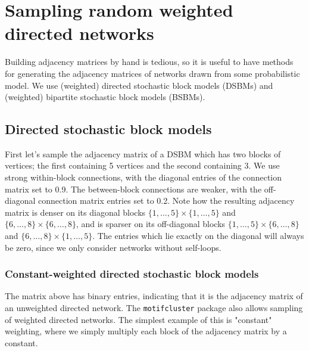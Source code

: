 \documentclass{article}
\begin{document}
\section{Sampling random weighted directed networks}

Building adjacency matrices by hand is tedious,
so it is useful to have methods for generating
the adjacency matrices of networks drawn from some probabilistic model.
We use (weighted) directed stochastic block models (DSBMs) and
(weighted) bipartite stochastic block models (BSBMs).

\subsection{Directed stochastic block models}

First let's sample the adjacency matrix of a DSBM
which has two blocks of vertices;
the first containing 5 vertices and the second containing 3.
We use strong within-block connections,
with the diagonal entries of the connection matrix set to 0.9.
The between-block connections are weaker, with the off-diagonal
connection matrix entries set to 0.2.
Note how the resulting adjacency matrix is denser
on its diagonal blocks
$\{1, \dots, 5\} \times \{1, \dots, 5\}$
and
$\{6, \dots, 8\} \times \{6, \dots, 8\}$,
and is sparser on its off-diagonal blocks
$\{1, \dots, 5\} \times \{6, \dots, 8\}$
and
$\{6, \dots, 8\} \times \{1, \dots, 5\}$.
The entries which lie exactly on the diagonal will
always be zero,
since we only consider networks without self-loops.

\begin{pyconsole}
\end{pyconsole}

\pagebreak

\begin{pyconsole}
\end{pyconsole}

\subsubsection{Constant-weighted directed stochastic block models}

The matrix above has binary entries,
indicating that it is the adjacency matrix of an unweighted
directed network.
The \texttt{motifcluster} package also allows sampling of weighted directed networks.
The simplest example of this is "constant" weighting,
where we simply multiply each block of the adjacency matrix by a constant.
\end{document}
